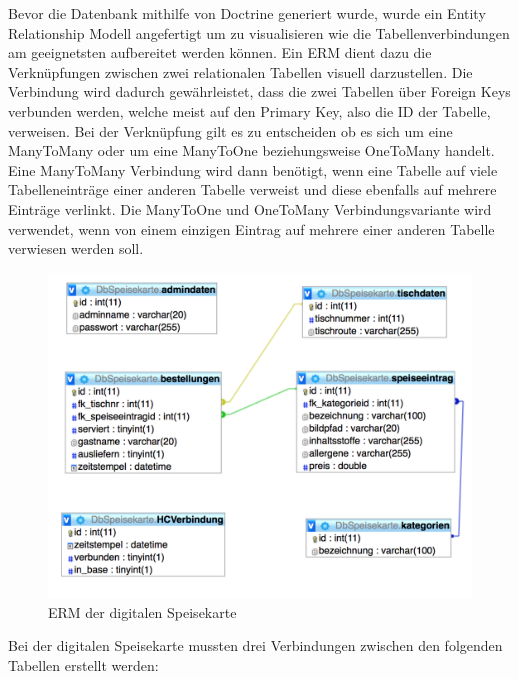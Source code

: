 Bevor die Datenbank mithilfe von Doctrine generiert wurde, wurde ein Entity Relationship Modell angefertigt um zu visualisieren wie die Tabellenverbindungen am geeignetsten aufbereitet werden können. Ein ERM dient dazu die Verknüpfungen zwischen zwei relationalen Tabellen visuell darzustellen. Die Verbindung wird dadurch gewährleistet, dass die zwei Tabellen über Foreign Keys verbunden werden, welche meist auf den Primary Key, also die ID der Tabelle, verweisen. Bei der Verknüpfung gilt es zu entscheiden ob es sich um eine ManyToMany oder um eine ManyToOne beziehungsweise OneToMany handelt. Eine ManyToMany Verbindung wird dann benötigt, wenn eine Tabelle auf viele Tabelleneinträge einer anderen Tabelle verweist und diese ebenfalls auf mehrere Einträge verlinkt. Die ManyToOne und OneToMany Verbindungsvariante wird verwendet, wenn von einem einzigen Eintrag auf mehrere einer anderen Tabelle verwiesen werden soll.
			\begin{figure}[H]
			\begin{centering}
			\includegraphics[width = 1\textwidth]{Bilder/Jok_ERM.png}
			\par\end{centering}
			\caption{ERM der digitalen Speisekarte}
			\label{ERM der digitalen Speisekarte}
			\end{figure}Bei der digitalen Speisekarte mussten drei Verbindungen zwischen den folgenden Tabellen erstellt werden:
